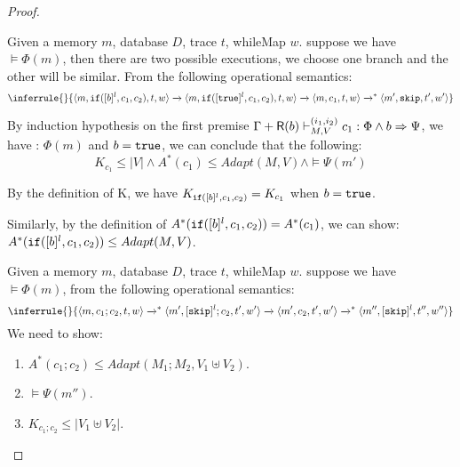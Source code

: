 \documentclass[a4paper,11pt]{article}
\begin{document}
\begin{proof}
\begin{itemize}
Given a memory $m$, database $D$, trace $t$, whileMap $w$. suppose we have $\vDash \Phi(m)$, then there are two possible executions, we choose one branch and the other will be similar. From the following operational semantics:
\[
\inferrule
{
}
{
\config{m, \eif([\bexpr]^l, c_1, c_2),t,w} 
\xrightarrow{} \config{m, \eif([\etrue]^l, c_1, c_2),t,w} 
\xrightarrow{} \config{m, c_1,  t,w} \xrightarrow{}^{*} \config{m', \eskip,  t',w'}
}
\]

By induction hypothesis on the first premise $ \Gamma + \mathsf{R}(b) \vdash^{(i_1, i_2)}_{M, V} c_1 
: \Phi \land b \Rightarrow \Psi $, we have : $\Phi(m)$ and $b = \mathtt{true}$, we can conclude that the following:
\[
 K_{c_1} \leq |V| \land A^{*}(c_1) \leq Adapt(M, V) \land  \vDash \Psi(m') 
\]

By the definition of K, we have $ K_{\mathtt{if}([b]^l, c_1, c_2)}= K_{c_1}$ when $b = \mathtt{true} $.

Similarly, by the definition of $A^{*}(\mathtt{if}([b]^l, c_1, c_2)) = A^{*}(c_1)$, we can show: $A^{*}(\mathtt{if}([b]^l, c_1, c_2)) \leq Adapt(M,V)  $.\\ 



Given a memory $m$, database $D$, trace $t$, whileMap $w$. suppose we have $\vDash \Phi(m)$, from the following operational semantics:
\[
\inferrule
{
}
{ \config{m, c_1 ; c_2,  t,w} \xrightarrow{}^{*}
\config{m', [\eskip]^{l} ; c_2,  t',w'} \xrightarrow{} \config{m', c_2,  t',w'} \xrightarrow{}^{*} \config{m'', [\eskip]^{l},  t'',w''} 
}
\]
%
We need to show:
\begin{enumerate}
    \item $ A^{*}( c_1; c_2) \leq Adapt(M_1 ; M_2, V_1 \uplus V_2) $.
    \item $\vDash \Psi(m'')$.
    \item $K_{c_1 ; c_2} \leq |V_1 \uplus V_2 | $.
\end{enumerate}


\end{itemize}
\end{proof}
\end{document}
